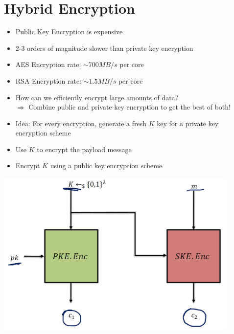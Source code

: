 

\chapter{Hybrid Encryption}
	
\begin{itemize}
	\item Public Key Encryption is expensive
	\item 2-3 orders of magnitude slower than private key encryption
	\item AES Encryption rate: $\sim 700MB/s$ per core
	\item RSA Encryption rate: $\sim 1.5MB/s$ per core
	\item How can we efficiently encrypt large amounts of data?\\
	$\Rightarrow$ Combine public and private key encryption to get the best of both!
	\item Idea: For every encryption, generate a fresh $K$ key for a private key encryption scheme
	\item Use $K$ to encrypt the payload message
	\item Encrypt $K$ using a public key encryption scheme
\end{itemize}
\begin{center}
	\includegraphics[width=120mm]{Graphics/Hybrid Encryption/he1.png}
\end{center}

